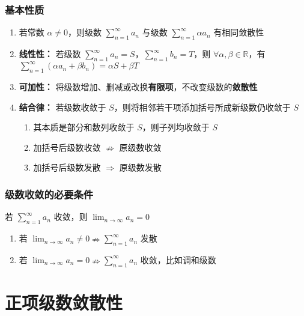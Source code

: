 \documentclass[lang = zh , final , oneside , openany , titlepage , zihao = -4 , linespread = 1.3 , baselineskip = false , cjk-font = windows , text-font = newtx , math-font = newtx , math-style = ISO , uppercase-greek = upright , integral-limits = false]{sjtureport}
\begin{document}
\subsubsection{基本性质}

\begin{enumerate}
\def\labelenumi{\arabic{enumi}.}
\item
  若常数 \(\alpha \neq 0\)，则级数
  \(\displaystyle \sum_{n=1}^\infty a_n\) 与级数
  \(\displaystyle \sum_{n=1}^\infty \alpha a_n\) 有相同敛散性
\item
  \textbf{线性性：} 若级数
  \(\displaystyle \sum_{n=1}^\infty a_n = S\)，\(\displaystyle \sum_{n=1}^\infty b_n = T\)，则
  \(\forall \alpha , \beta\in \mathbb{R}\)，有
  \(\displaystyle \sum_{n=1}^\infty (\alpha a_n + \beta b_n) = \alpha S + \beta T\)
\item
  \textbf{可加性：}
  将级数增加、删减或改换\textbf{有限项}，不改变级数的\textbf{敛散性}
\item
  \textbf{结合律：} 若级数收敛于
  \(S\)，则将相邻若干项添加括号所成新级数仍收敛于 \(S\)

  \begin{enumerate}
  \item
    其本质是部分和数列收敛于 \(S\)，则子列均收敛于 \(S\)
  \item
    加括号后级数收敛 \(\nRightarrow\) 原级数收敛
  \item
    加括号后级数发散 \(\Rightarrow\) 原级数发散
  \end{enumerate}
\end{enumerate}

\subsubsection{级数收敛的必要条件}

\begin{theorem}
    若 \(\displaystyle \sum_{n=1}^\infty a_n\) 收敛，则
\(\displaystyle \lim_{n\to\infty} a_n = 0\)
\end{theorem}

\begin{enumerate}
\item
  若
  \(\displaystyle \lim_{n\to\infty} a_n \neq 0 \nRightarrow \displaystyle \sum_{n=1}^\infty a_n\)
  发散
\item
  若
  \(\displaystyle \lim_{n\to\infty} a_n = 0 \nRightarrow \displaystyle \sum_{n=1}^\infty a_n\)
  收敛，比如调和级数
\end{enumerate}

\section{正项级数敛散性}
\end{document}

